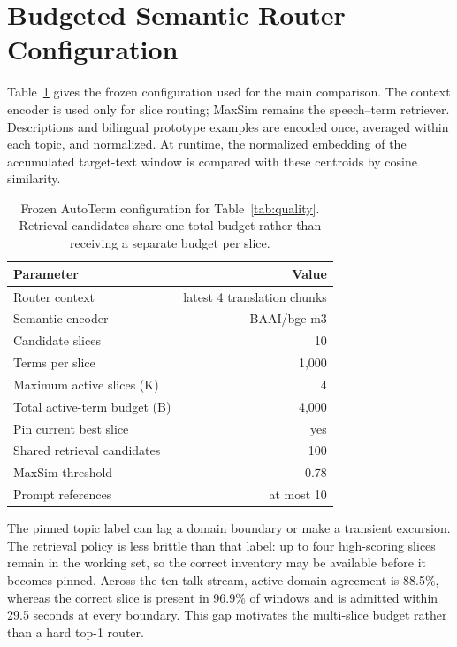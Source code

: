 \appendix

\section{Budgeted Semantic Router Configuration}
\label{app:router}

Table~\ref{tab:router-config} gives the frozen configuration used for the main
comparison. The context encoder is used only for slice routing; MaxSim remains
the speech--term retriever. Descriptions and bilingual prototype examples are
encoded once, averaged within each topic, and normalized. At runtime, the
normalized embedding of the accumulated target-text window is compared with
these centroids by cosine similarity.

\begin{table}[ht]
\centering
\small
\setlength{\tabcolsep}{5.5pt}
\begin{tabular}{lr}
\toprule
Parameter & Value \\
\midrule
Router context & latest 4 translation chunks \\
Semantic encoder & BAAI/bge-m3 \\
Candidate slices & 10 \\
Terms per slice & 1,000 \\
Maximum active slices (K) & 4 \\
Total active-term budget (B) & 4,000 \\
Pin current best slice & yes \\
Shared retrieval candidates & 100 \\
MaxSim threshold & 0.78 \\
Prompt references & at most 10 \\
\bottomrule
\end{tabular}
\caption{Frozen AutoTerm configuration for Table~\ref{tab:quality}. Retrieval
candidates share one total budget rather than receiving a separate budget per
slice.}
\label{tab:router-config}
\end{table}

The pinned topic label can lag a domain boundary or make a transient excursion.
The retrieval policy is less brittle than that label: up to four high-scoring
slices remain in the working set, so the correct inventory may be available
before it becomes pinned. Across the ten-talk stream, active-domain agreement
is 88.5\%, whereas the correct slice is present in 96.9\% of windows and is
admitted within 29.5 seconds at every boundary. This gap motivates the
multi-slice budget rather than a hard top-1 router.

